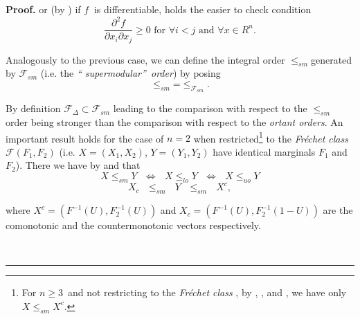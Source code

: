 \documentclass[onecolumn]{article}
\newenvironment{proof}[1][Proof]{\noindent\textbf{#1.} }{\ \rule{0.5em}{0.5em}}
\begin{document}
\begin{proof}
or (by \cite[Remark 6.13]{[5]}) if $f$ $\ $is differentiable, holds the
easier to check condition 
\begin{equation}
\frac{\partial ^{2}f}{\partial x_{i}\partial x_{j}}\geq 0\text{ for }\forall
i<j\text{ and }\forall x\in R^{n}.  \label{225.9a}
\end{equation}

Analogously to the previous case, we can define the integral order $\leq
_{sm}$generated by $\mathcal{F}_{sm}$ (i.e. the \textit{\textquotedblleft
supermodular\textquotedblright\ order}) by posing 
\begin{equation}
\leq _{sm}\text{=}\leq _{\mathcal{F}_{sm}}.  \label{225.10}
\end{equation}

By definition $\mathcal{F}_{\Delta }\subset \mathcal{F}_{sm}$ leading to the
comparison with respect to the $\leq _{sm}$ order being stronger than the
comparison with respect to the \textit{ortant orders}. An important result
holds for the case of $n=2$ when restricted\footnote{{\footnotesize For }$%
n\geq 3${\footnotesize \ and not restricting to the \textit{Fr\'{e}chet class%
}, by \cite{[34]}, \cite{[30]}, and \cite[Theorem 6.14]{[5]}, we have only }$%
X\leq _{sm}X^{c}.$} to the \textit{Fr\'{e}chet class} $\mathcal{F}%
(F_{1},F_{2})$ (i.e. $X=(X_{1},X_{2})$, $Y=(Y_{1},Y_{2})$ have identical
marginals $F_{1}$ and $F_{2}$). There we have by \cite{[35]} and \cite[%
Theorem 6.15]{[5]} that%
\begin{equation}
X\leq _{sm}Y\text{ }\Longleftrightarrow \text{ }X\leq _{lo}Y\text{ }%
\Longleftrightarrow \text{ }X\leq _{uo}Y  \label{225.11a}
\end{equation}%
\begin{equation}
X_{c}\text{ }\leq _{sm}\text{ }Y\text{ }\leq _{sm}\text{ }X^{c},
\label{225.12}
\end{equation}

where $X^{c}=(F^{-1}(U),F_{2}^{-1}(U))$ and $%
X_{c}=(F^{-1}(U),F_{2}^{-1}(1-U))$ are the comonotonic and the
countermonotonic vectors respectively.


\end{proof}
\end{document}
